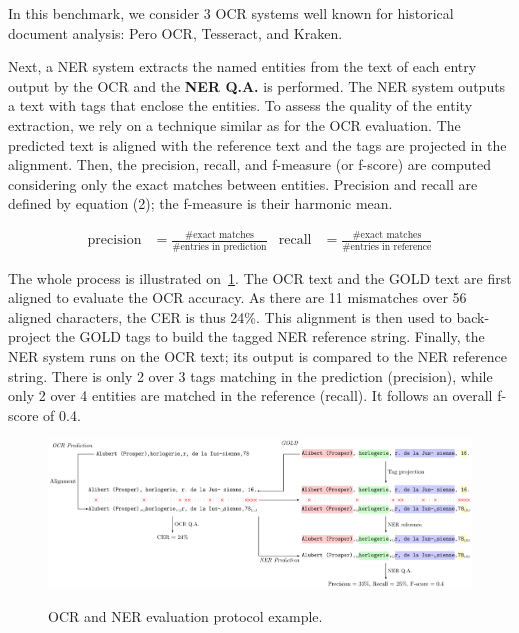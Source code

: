 In this benchmark, we consider 3 OCR systems well known for historical document analysis: Pero OCR, Tesseract, and Kraken. 



Next, a NER system extracts the named entities from the text of each entry output by the OCR and the \textbf{NER Q.A.}
is performed. The NER system outputs a text with tags that enclose the entities. To assess the quality of the entity
extraction, we rely on a technique similar as for the OCR evaluation. The predicted text is aligned with the reference
text and the tags are projected in the alignment. Then, the precision, recall, and f-measure (or f-score) are computed considering
only the exact matches between entities. Precision and recall are defined by equation (2); the f-measure is their harmonic mean.

\begin{align}
    \mathrm{precision} &= \frac{\text{\#exact matches}}{\text{\#entries in prediction}} & \mathrm{recall} &= \frac{\text{\#exact matches}}{\text{\#entries in reference}}
\end{align}


The whole process is illustrated on~\cref{fig.eval-ocr-ner}. The OCR text and the GOLD text are first aligned to
evaluate the OCR accuracy. As there are 11 mismatches over 56 aligned characters, the CER is thus 24\%. This alignment
is then used to back-project the GOLD tags to build the tagged NER reference string. Finally, the NER system runs on the
OCR text; its output is compared to the NER reference string. There is only 2 over 3 tags matching in the prediction (precision),
while only 2 over 4 entities are matched in the reference (recall). It follows an overall f-score of 0.4.


\begin{figure}[tb]
    \includegraphics[width=\linewidth]{figs/eval-ocr-ner.pdf}
    \label{fig.eval-ocr-ner}
    \caption{OCR and NER evaluation protocol example.}
\end{figure}



